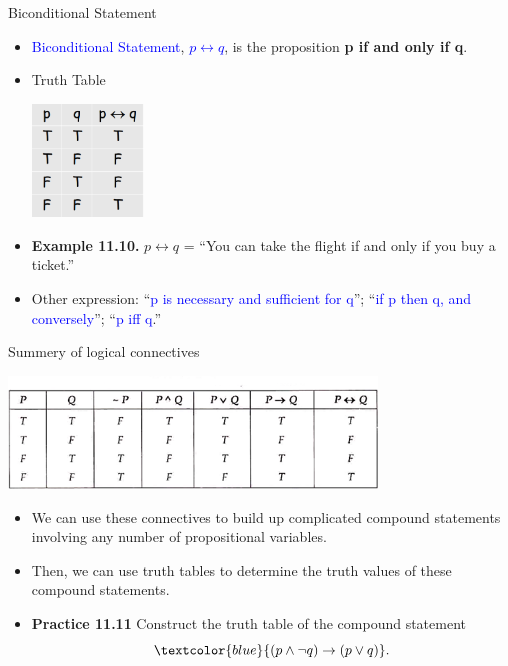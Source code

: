 \documentclass[aspectratio=169]{beamer}
\providecommand{\Blue}[1]{\textcolor{blue}{#1}}
\begin{document}
\begin{frame}[plain]{Biconditional Statement }

\begin{itemize}[<+->]
 \item \Blue{Biconditional Statement}, \Blue{$p\leftrightarrow q$}, 
   is the proposition {\bf p if and only if q}.
  \item Truth Table 
    
              \begin{center}
                \includegraphics[height=3cm]{./img/lecture11-fig7.png}
              \end{center}  
  \item {\bf Example 11.10.} $p\leftrightarrow q$ = ``You can take the flight if and only if you buy a ticket.''
  \item Other expression: 
    ``\Blue{p is necessary and sufficient for q}''; ``\Blue{if p then q, and conversely}'';
      ``\Blue{p iff q}.'' 
    \end{itemize}
\end{frame}

\begin{frame}[plain]{ Summery of logical connectives}

\begin{center}
 
  
                \includegraphics[height=3cm]{./img/lecture11-fig8.png}
              \end{center} 

\begin{itemize}
 \item {\small We can use these connectives
to build up complicated compound statements involving any number of propositional
variables.} 
 \item {\small Then, we can use truth tables to determine the truth values of these compound statements.}
  \item {\bf Practice 11.11} Construct the truth table of the compound statement
       \[ \Blue{(p\wedge \neg q) \rightarrow (p\vee q)}. \]
    \end{itemize}
\end{frame}
\end{document}
